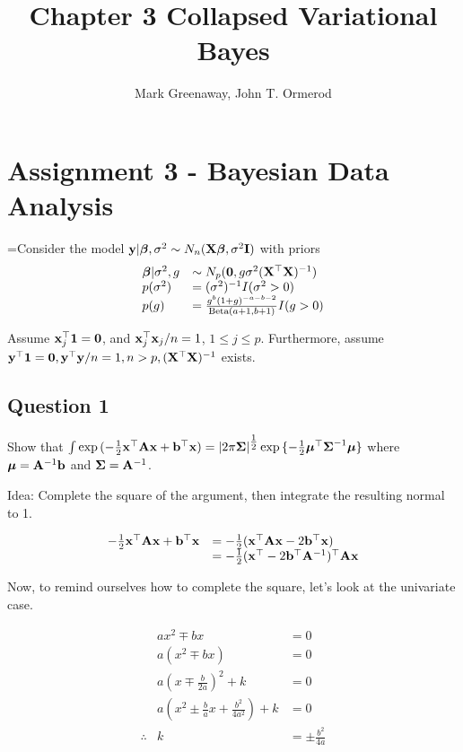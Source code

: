 \documentclass{amsart}[12pt]
\title{Chapter 3 Collapsed Variational Bayes}
\author{Mark Greenaway, John T. Ormerod}
\begin{document}
\maketitle

\section{Assignment 3 - Bayesian Data Analysis}

=Consider the model ${\bf y} | {\boldsymbol \beta}, \sigma^2 \sim N_n({\bf X} {\boldsymbol \beta}, \sigma^2 {\bf I})$ with priors
\begin{equation*}
\begin{array}{ll}
{\boldsymbol\beta} | \sigma^2, g &\sim N_p({\bf 0}, g \sigma^2({\bf X}^\top {\bf X})^{-1}) \\
p(\sigma^2) &= (\sigma^2)^{-1} I(\sigma^2 > 0) \\
p(g) &= \frac{g^b (1 + g)^{-a - b - 2}}{\text{Beta}(a + 1, b + 1)} I(g > 0)
\end{array}
\end{equation*}

Assume ${\bf x}_j^\top{\bf1} = {\bf 0}$, and ${\bf x}_j^\top {\bf x}_j / n = 1$, $1 \leq j \leq p$.
Furthermore, assume ${\bf y}^\top {\bf1} = {\bf 0}, {\bf y}^\top {\bf y} / n  = 1, n > p, ({\bf X}^\top {\bf X})^{-1}$ exists.

\subsection{Question 1}

Show that $\int \exp{(- \tfrac{1}{2} {\bf x}^\top {\bf A}{\bf x}+ {\bf b}^\top {\bf x})} = |2 \pi {\boldsymbol\Sigma}|^{\tfrac{1}{2}} \exp{\{ - \tfrac{1}{2} {\boldsymbol\mu}^\top {\boldsymbol\Sigma}^{-1} {\boldsymbol\mu}\}}$ where ${\boldsymbol \mu} = {\bf A}^{-1} {\bf b}$ and ${\boldsymbol \Sigma} = {\bf A}^{-1}$.

Idea: Complete the square of the argument, then integrate the resulting normal to 1.

\begin{equation*}
\begin{array}{ll}
-\tfrac{1}{2} {\bf x}^\top {\bf A} {\bf x} + {\bf b}^\top {\bf x} &= -\tfrac{1}{2} ({\bf x}^\top {\bf A} {\bf x} - 2 {\bf b}^\top {\bf x}) \\
&= -\tfrac{1}{2} ({\bf x}^\top - 2 {\bf b}^\top {\bf A}^{-1})^\top {\bf A} {\bf x}
\end{array}
\end{equation*}

Now, to remind ourselves how to complete the square, let's look at the univariate case.

\begin{equation*}
\begin{array}{rcl}
& ax^2 \mp bx &= 0 \\
& a(x^2 \mp bx) &= 0 \\
& a(x \mp \frac{b}{2a})^2 + k &= 0 \\
& a(x^2 \pm \frac{b}{a} x + \frac{b^2}{4a^2}) + k &= 0 \\
\therefore & k &= \pm \frac{b^2}{4a}
\end{array}
\end{equation*}
\end{document}
